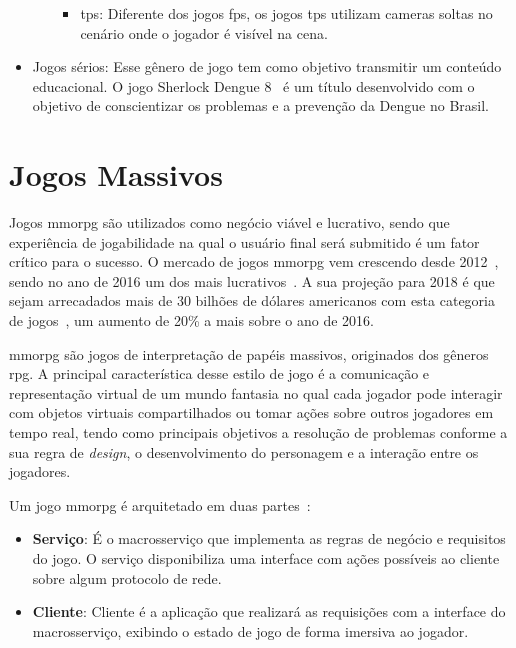 \begin{itemize}
\begin{itemize}
\begin{itemize}
          \item \ac{tps}: Diferente dos jogos \ac{fps}, os jogos \ac{tps} utilizam cameras soltas no cenário onde o jogador é visível na cena.
        \end{itemize}
    \end{itemize}
  \item Jogos sérios: Esse gênero de jogo tem como objetivo transmitir um conteúdo educacional. O jogo Sherlock Dengue 8~\cite{sherlock_dengue} é um título desenvolvido com o objetivo de conscientizar os problemas e a prevenção da Dengue no Brasil.
\end{itemize}


\section{Jogos Massivos}
\label{sec:mmorpg}



Jogos \ac{mmorpg} são utilizados como negócio viável e lucrativo, sendo que experiência de jogabilidade na qual o usuário final será submitido é um fator crítico para o sucesso.
%
O mercado de jogos \ac{mmorpg} vem crescendo desde 2012~\cite{new_york_times}, sendo no ano de 2016 um dos mais lucrativos~\cite{statista_2016}.
%
A sua projeção para 2018 é que sejam arrecadados mais de 30 bilhões de dólares americanos com esta categoria de jogos~\cite{statista_2018}, um aumento de 20\% a mais sobre o ano de 2016.



\ac{mmorpg} são jogos de interpretação de papéis massivos, originados dos gêneros \ac{rpg}.
%
A principal característica desse estilo de jogo é a comunicação e representação virtual de um mundo fantasia no qual cada jogador pode interagir com objetos virtuais compartilhados ou tomar ações sobre outros jogadores em tempo real, tendo como principais objetivos a resolução de problemas conforme a sua regra de \textit{design}, o desenvolvimento do personagem e a interação entre os jogadores\cite{video_game_technologies}.
%

Um jogo \ac{mmorpg} é arquitetado em duas partes~\cite{mmo_analytic}:
\begin{itemize}
  \item \textbf{Serviço}: É o macrosserviço que implementa as regras de negócio e requisitos do jogo.
  O serviço disponibiliza uma interface com ações possíveis ao cliente sobre algum protocolo de rede.
  \item \textbf{Cliente}: Cliente é a aplicação que realizará as requisições com a interface do macrosserviço, exibindo o estado de jogo de forma imersiva ao jogador.
\end{itemize}



